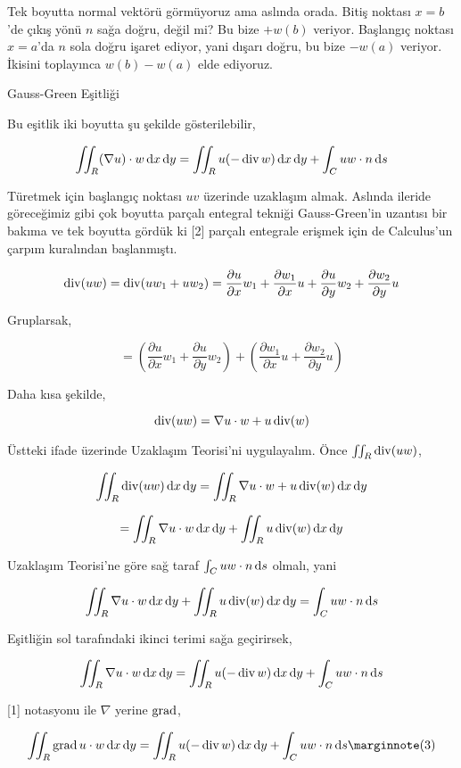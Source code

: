 \documentclass[12pt,fleqn]{article}\usepackage{../../common}
\begin{document}
Tek boyutta normal vektörü görmüyoruz ama aslında orada. Bitiş noktası
$x=b$'de çıkış yönü $n$ sağa doğru, değil mi? Bu bize $+w(b)$ veriyor.
Başlangıç noktası $x=a$'da $n$ sola doğru işaret ediyor, yani dışarı doğru,
bu bize $-w(a)$ veriyor. İkisini toplayınca $w(b) - w(a)$ elde ediyoruz.

Gauss-Green Eşitliği

Bu eşitlik iki boyutta şu şekilde gösterilebilir,

$$
\iint_R (\nabla u ) \cdot w \,\mathrm{d} x \,\mathrm{d} y =
\iint_R u (- \operatorname{div} w) \,\mathrm{d} x \,\mathrm{d} y + \int_C u w \cdot n \,\mathrm{d} s
$$

Türetmek için başlangıç noktası $uv$ üzerinde uzaklaşım almak. Aslında
ileride göreceğimiz gibi çok boyutta parçalı entegral tekniği Gauss-Green'in
uzantısı bir bakıma ve tek boyutta gördük ki [2] parçalı entegrale erişmek
için de Calculus'un çarpım kuralından başlanmıştı.

$$
\operatorname{div} (uw) = \operatorname{div} (u w_1 + u w_2) =
\frac{\partial u}{\partial x} w_1 +
\frac{\partial w_1}{\partial x} u +
\frac{\partial u}{\partial y} w_2 +
\frac{\partial w_2}{\partial y} u 
$$

Gruplarsak,

$$
= \left( 
\frac{\partial u}{\partial x} w_1 +
\frac{\partial u}{\partial y} w_2 \right) +
\left( 
\frac{\partial w_1}{\partial x} u +
\frac{\partial w_2}{\partial y} u \right)
$$

Daha kısa şekilde,

$$
\operatorname{div} (uw) = \nabla u \cdot w + u \operatorname{div}(w)
$$

Üstteki ifade üzerinde Uzaklaşım Teorisi'ni uygulayalım. Önce
$\iint_R \operatorname{div} (uw)$,

$$
\iint_R \operatorname{div} (uw) \,\mathrm{d} x \,\mathrm{d} y= \iint_R \nabla u \cdot w + u \operatorname{div}(w) \,\mathrm{d} x \,\mathrm{d} y
$$

$$
= \iint_R \nabla u \cdot w  \,\mathrm{d} x \,\mathrm{d} y + \iint_R u \operatorname{div}(w) \,\mathrm{d} x \,\mathrm{d} y
$$

Uzaklaşım Teorisi'ne göre sağ taraf $\int_C uw \cdot n \,\mathrm{d} s$ olmalı, yani

$$
\iint_R \nabla u \cdot w  \,\mathrm{d} x \,\mathrm{d} y + \iint_R u \operatorname{div}(w) \,\mathrm{d} x \,\mathrm{d} y = \int_C uw \cdot n \,\mathrm{d} s
$$

Eşitliğin sol tarafındaki ikinci terimi sağa geçirirsek,

$$
\iint_R \nabla u \cdot w  \,\mathrm{d} x \,\mathrm{d} y =
\iint_R u (-\operatorname{div} w) \,\mathrm{d} x \,\mathrm{d} y + \int_C uw \cdot n \,\mathrm{d} s
$$

[1] notasyonu ile $\nabla$ yerine $\operatorname{grad}$,

$$
\iint_R \grad u \cdot w  \ud x \ud y =
\iint_R u (-\bdiv w) \ud x \ud y + \int_C uw \cdot n \ud s
\mlabel{3}
$$
\end{document}
